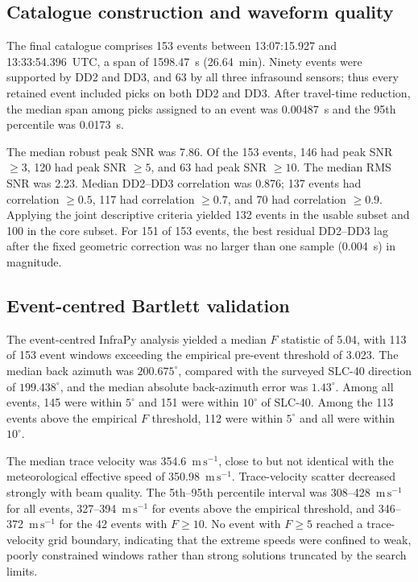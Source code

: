 \subsection{Catalogue construction and waveform quality}
\label{sec:results_catalogue_quality}

The final catalogue comprises 153 events between 13:07:15.927 and
13:33:54.396~UTC, a span of 1598.47~s (26.64~min).  Ninety events were supported
by DD2 and DD3, and 63 by all three infrasound sensors; thus every retained
event included picks on both DD2 and DD3.  After travel-time
reduction, the median span among picks assigned to an event was 0.00487~s and
the 95th percentile was 0.0173~s.

The median robust peak SNR was 7.86.  Of the 153 events, 146 had peak SNR
\(\geq3\), 120 had peak SNR \(\geq5\), and 63 had peak SNR \(\geq10\).  The
median RMS SNR was 2.23.  Median DD2--DD3 correlation was 0.876; 137 events had
correlation \(\geq0.5\), 117 had correlation \(\geq0.7\), and 70 had
correlation \(\geq0.9\).  Applying the joint descriptive criteria yielded 132
events in the usable subset and 100 in the core subset.  For 151 of 153 events,
the best residual DD2--DD3 lag after the fixed geometric correction was no
larger than one sample (0.004~s) in magnitude.

\subsection{Event-centred Bartlett validation}
\label{sec:results_event_centred_bartlett}

The event-centred InfraPy analysis yielded a median \(F\) statistic of 5.04,
with 113 of 153 event windows exceeding the empirical pre-event threshold of
3.023.  The median back azimuth was \(200.675^{\circ}\), compared with the
surveyed SLC-40 direction of \(199.438^{\circ}\), and the median absolute
back-azimuth error was \(1.43^{\circ}\).  Among all events, 145 were within
\(5^{\circ}\) and 151 were within \(10^{\circ}\) of SLC-40.  Among the 113
events above the empirical \(F\) threshold, 112 were within \(5^{\circ}\) and
all were within \(10^{\circ}\).

The median trace velocity was 354.6~\(\mathrm{m\,s^{-1}}\), close to but not
identical with the meteorological effective speed of
350.98~\(\mathrm{m\,s^{-1}}\).  Trace-velocity scatter decreased strongly with
beam quality.  The 5th--95th percentile interval was 308--428~\(\mathrm{m\,s^{-1}}\)
for all events, 327--394~\(\mathrm{m\,s^{-1}}\) for events above the empirical
threshold, and 346--372~\(\mathrm{m\,s^{-1}}\) for the 42 events with
\(F\geq10\).  No event with \(F\geq5\) reached a trace-velocity grid boundary,
indicating that the extreme speeds were confined to weak, poorly constrained
windows rather than strong solutions truncated by the search limits.

